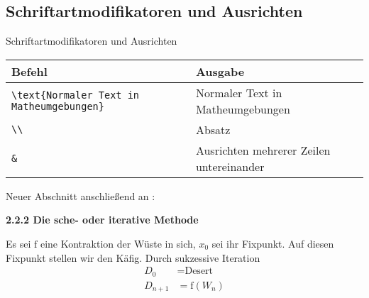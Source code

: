 \documentclass["WS\space 16-17\space -\space LaTeX-Kurs\space -\space Praesentation\space -\space 1.tex"]{subfiles}
\begin{document}
\subsection{Schriftartmodifikatoren und Ausrichten}
\begin{frame}[c]
	\begin{center}
		\large Schriftartmodifikatoren und Ausrichten
	\end{center}
\end{frame}
\begin{frame}[fragile]
	\begin{center}
		\begin{tabular}{ll}
			\toprule
			Befehl													&	Ausgabe										\\ \midrule
			\lstinline|\text{Normaler Text in Matheumgebungen}|		&	Normaler Text in Matheumgebungen			\\
			\lstinline|\\|											&	Absatz										\\
			\lstinline|&|											&	Ausrichten mehrerer Zeilen untereinander	\\
			\bottomrule
		\end{tabular}
	\end{center}
	\pause\btVFill
	\Aufgabee
	Neuer Abschnitt anschließend an :
	\begin{outputbox}
		{\large\textbf{2.2.2 Die sche- oder iterative Methode}}
		
		Es sei $\mathrm{f}$ eine Kontraktion der Wüste in sich, $x_0$ sei ihr Fixpunkt. Auf diesen Fixpunkt stellen wir den Käfig. Durch sukzessive Iteration
		\begin{align}
		    D_0 	&= \text{Desert} \\
	        D_{n+1} &= \mathrm{f}(W_n)
		\end{align}
	\end{outputbox}
	\vspace{0.3cm}
\end{frame}
\end{document}
